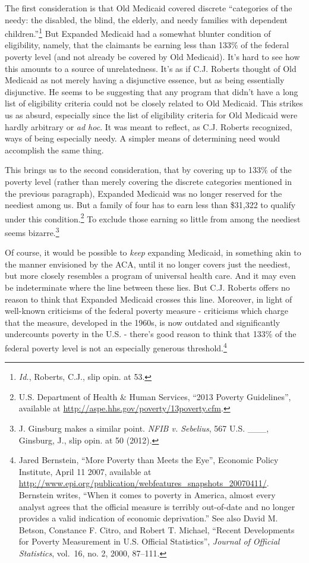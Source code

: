 \documentclass[
  10pt,
  letterpaper,
  DIV=11,
  numbers=noendperiod,
  twoside]{scrartcl}
\begin{document}
The first consideration is that Old Medicaid covered discrete
``categories of the needy: the disabled, the blind, the elderly, and
needy families with dependent children.''\footnote{\emph{Id.}, Roberts,
  C.J., slip opin. at 53.} But Expanded Medicaid had a somewhat blunter
condition of eligibility, namely, that the claimants be earning less
than 133\% of the federal poverty level (and not already be covered by
Old Medicaid). It's hard to see how this amounts to a source of
unrelatedness. It's as if C.J. Roberts thought of Old Medicaid as not
merely having a disjunctive essence, but as being essentially
disjunctive. He seems to be suggesting that any program that didn't have
a long list of eligibility criteria could not be closely related to Old
Medicaid. This strikes us as absurd, especially since the list of
eligibility criteria for Old Medicaid were hardly arbitrary or \emph{ad
hoc}. It was meant to reflect, as C.J. Roberts recognized, ways of being
especially needy. A simpler means of determining need would accomplish
the same thing.

This brings us to the second consideration, that by covering up to 133\%
of the poverty level (rather than merely covering the discrete
categories mentioned in the previous paragraph), Expanded Medicaid was
no longer reserved for the neediest among us. But a family of four has
to earn less than \$31,322 to qualify under this condition.\footnote{U.S.
  Department of Health \& Human Services, ``2013 Poverty Guidelines'',
  available at \url{http://aspe.hhs.gov/poverty/13poverty.cfm}.} To
exclude those earning so little from among the neediest seems
bizarre.\footnote{J. Ginsburg makes a similar point. \emph{NFIB v.
  Sebelius}, 567 U.S. \_\_\_, Ginsburg, J., slip opin. at 50 (2012).}

Of course, it would be possible to \emph{keep} expanding Medicaid, in
something akin to the manner envisioned by the ACA, until it no longer
covers just the neediest, but more closely resembles a program of
universal health care. And it may even be indeterminate where the line
between these lies. But C.J. Roberts offers no reason to think that
Expanded Medicaid crosses this line. Moreover, in light of well-known
criticisms of the federal poverty measure - criticisms which charge that
the measure, developed in the 1960s, is now outdated and significantly
undercounts poverty in the U.S. - there's good reason to think that
133\% of the federal poverty level is not an especially generous
threshold.\footnote{Jared Bernstein, ``More Poverty than Meets the
  Eye'', Economic Policy Institute, April 11 2007, available at
  \url{http://www.epi.org/publication/webfeatures_snapshots_20070411/}.
  Bernstein writes, ``When it comes to poverty in America, almost every
  analyst agrees that the official measure is terribly out-of-date and
  no longer provides a valid indication of economic deprivation.'' See
  also David M. Betson, Constance F. Citro, and Robert T. Michael,
  ``Recent Developments for Poverty Measurement in U.S. Official
  Statistics'', \emph{Journal of Official Statistics}, vol.~16, no. 2,
  2000, 87--111.}
\end{document}
